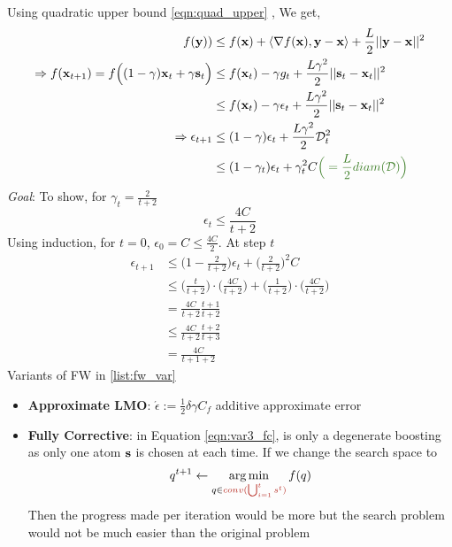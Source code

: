     Using quadratic upper bound \ref{eqn:quad_upper} ,
    We get,
    \begin{align}
      f(\by)) &\leq f(\bx) + \langle \grad f(\bx), \by - \bx \rangle + \frac{L}{2}||\by - \bx||^2 \\
      \Rightarrow f(\bx_{t+1}) = f\Big((1 - \gamma)\bx_t + \gamma \bs_t\Big) & \leq f(\bx_t) - \gamma g_t + 
      \frac{L\gamma^2}{2}||\bs_t - \bx_t||^2 \nonumber\\
                                                                             &\leq f(\bx_t) - \gamma \epsilon_t 
                                                                             + \frac{L\gamma^2}{2}||\bs_t - \bx_t||^2 \nonumber\\
      \Rightarrow \epsilon_{t + 1} &\leq  (1 - \gamma) \epsilon_t 
      + \frac{L\gamma^2}{2}\data_t^2 \\
                                   &\leq(1 - \gamma_t) \epsilon_t + \gamma_t^2 C 
                                   \comment{\Big(= \frac{L}{2}diam(\data)\Big)}\\
    \end{align}
    \emph{Goal}: To show, for $\gamma_t = \frac{2}{t + 2}$
    \begin{equation}
      \epsilon_t \leq \frac{4C}{t + 2}
    \end{equation}
    Using induction, for $t = 0$, $\epsilon_0 = C \leq \frac{4C}{2}$. At step $t$
    \begin{align*}
      \epsilon_{t + 1} &\leq \Big(1 - \frac{2}{t + 2}\Big)\epsilon_t + \Big(\frac{2}{t + 2}\Big)^2 C \\
                       &\leq \Big(\frac{t}{t + 2}\Big) \cdot \Big(\frac{4C}{t + 2}\Big) 
                       + \Big(\frac{1}{t + 2}\Big) \cdot \Big(\frac{4C}{t + 2}\Big) \\
                       &= \frac{4C}{t + 2} \frac{t + 1}{t + 2} \\
                       &\leq \frac{4C}{t + 2} \frac{t + 2}{t + 3} \\
                       &= \frac{4C}{t + 1 + 2} 
    \end{align*}
     \cite{jaggi2013revisiting}
    \INPROGRESS
    Variants of FW in \ref{list:fw_var}
    \begin{itemize} \label{list:fw_var}
      \item {\bf Approximate LMO}: $\acute{\epsilon} := \frac{1}{2} \delta \gamma C_f$
        additive approximate error
      \item {\bf Fully Corrective}: in Equation \ref{eqn:var3_fc}, is only a degenerate
        boosting as only one atom $\mathbf{s}$ is chosen at each time. If we change the
        search space to
        $$
        q^{t + 1} \gets \argmin\limits_{q \in \red{conv(\bigcup_{i=1}^{t}{s^t})}}f(q)
        $$
        Then the progress made per iteration would be more but the search problem
        would not be much easier than the original problem
    \end{itemize}
